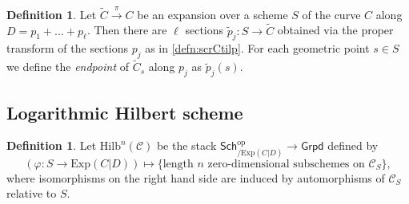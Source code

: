 \documentclass[10.5pt]{amsart}
\theoremstyle{definition}
\theoremstyle{definition}
\theoremstyle{definition}
\theoremstyle{definition}
\newtheorem{lemma}[theorem]{Lemma}
\newtheorem{definition}[theorem]{Definition}
\newcommand{\ra}{\rightarrow}
\begin{document}
\begin{definition}
    Let $\tilde{C}\xrightarrow{\pi} C$ be an expansion over a scheme $S$ of the curve $C$ along $D=p_1+\dots+ p_\ell$.
    Then there are $\ell$ sections $\tilde p_j: S \ra \tilde C$ obtained via the proper transform of the sections $p_j$ as in \ref{defn:scrCtilp}. For each geometric point $s \in S$ we define the \textit{endpoint} of $\tilde C_s$ along $p_j$ as $\tilde p_j(s)$.
\end{definition}




     


\subsection{Logarithmic Hilbert scheme}

\begin{definition}
  Let $\mathrm{Hilb}^n(\mathscr{C})$ be the stack $\mathsf{Sch}_{/\mathrm{Exp}(C|D)}^{\mathrm{op}}\to \mathsf{Grpd}$ defined by $$(\varphi: S\to \mathrm{Exp}(C|D))\mapsto \{\text{length }n \text{ zero-dimensional subschemes on } \mathscr{C}_S\},$$ where isomorphisms on the right hand side are induced by automorphisms of $\mathscr{C}_S$ relative to $S.$
\end{definition}
\end{document}
